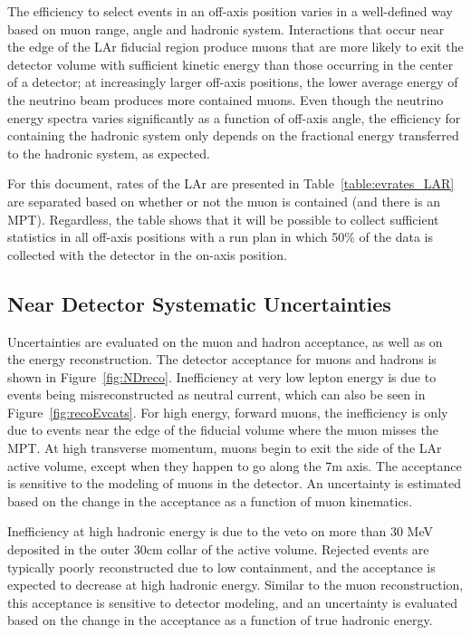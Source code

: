 The efficiency to select events in an off-axis position varies in a well-defined way based on muon range, angle and hadronic system. Interactions that occur near the edge of the LAr fiducial region produce muons that are more likely to exit the detector volume with sufficient kinetic energy than those occurring in the center of a detector; at increasingly larger off-axis positions, the lower average energy of the neutrino beam produces more contained muons. Even though the neutrino energy spectra varies significantly as a function of off-axis angle, the efficiency for containing the hadronic system only depends on the fractional energy transferred to the hadronic system, as expected. 

For this document, rates of the LAr are presented in Table~\ref{table:evrates_LAR} are separated based on whether or not the muon is contained (and there is an MPT). Regardless, the table shows that it will be possible to collect sufficient statistics in all off-axis positions with a run plan in which 50\% of the data is collected with the detector in the on-axis position. 

\subsection{Near Detector Systematic Uncertainties}

Uncertainties are evaluated on the muon and hadron acceptance, as well as on the energy reconstruction. The detector acceptance for muons and hadrons is shown in Figure~\ref{fig:NDreco}. Inefficiency at very low lepton energy is due to events being misreconstructed as neutral current, which can also be seen in Figure~\ref{fig:recoEvcats}. For high energy, forward muons, the inefficiency is only due to events near the edge of the fiducial volume where the muon misses the MPT. At high transverse momentum, muons begin to exit the side of the LAr active volume, except when they happen to go along the 7m axis. The acceptance is sensitive to the modeling of muons in the detector. An uncertainty is estimated based on the change in the acceptance as a function of muon kinematics.

Inefficiency at high hadronic energy is due to the veto on more than 30 MeV deposited in the outer 30cm collar of the active volume. Rejected events are typically poorly reconstructed due to low containment, and the acceptance is expected to decrease at high hadronic energy. Similar to the muon reconstruction, this acceptance is sensitive to detector modeling, and an uncertainty is evaluated based on the change in the acceptance as a function of true hadronic energy.

